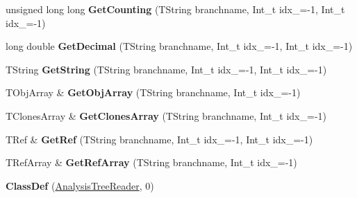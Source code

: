 \begin{DoxyCompactItemize}
\item 
\hypertarget{class_h_a_l_1_1_analysis_tree_reader_ad15baf30f4bed367d3ae74d9f30f9ac2}{unsigned long long {\bfseries Get\-Counting} (T\-String branchname, Int\-\_\-t idx\-\_=-\/1, Int\-\_\-t idx\-\_=-\/1)}\label{class_h_a_l_1_1_analysis_tree_reader_ad15baf30f4bed367d3ae74d9f30f9ac2}

\item 
\hypertarget{class_h_a_l_1_1_analysis_tree_reader_a487d617c759a5964df2af184b40cbfc2}{long double {\bfseries Get\-Decimal} (T\-String branchname, Int\-\_\-t idx\-\_=-\/1, Int\-\_\-t idx\-\_=-\/1)}\label{class_h_a_l_1_1_analysis_tree_reader_a487d617c759a5964df2af184b40cbfc2}

\item 
\hypertarget{class_h_a_l_1_1_analysis_tree_reader_a0039c2448c4bd7e75bd56383a82498e2}{T\-String {\bfseries Get\-String} (T\-String branchname, Int\-\_\-t idx\-\_=-\/1, Int\-\_\-t idx\-\_=-\/1)}\label{class_h_a_l_1_1_analysis_tree_reader_a0039c2448c4bd7e75bd56383a82498e2}

\item 
\hypertarget{class_h_a_l_1_1_analysis_tree_reader_a1c57d60d503bc7651e356326a72ad965}{T\-Obj\-Array \& {\bfseries Get\-Obj\-Array} (T\-String branchname, Int\-\_\-t idx\-\_=-\/1)}\label{class_h_a_l_1_1_analysis_tree_reader_a1c57d60d503bc7651e356326a72ad965}

\item 
\hypertarget{class_h_a_l_1_1_analysis_tree_reader_a487443628db3c4645715d06a767ac87c}{T\-Clones\-Array \& {\bfseries Get\-Clones\-Array} (T\-String branchname, Int\-\_\-t idx\-\_=-\/1)}\label{class_h_a_l_1_1_analysis_tree_reader_a487443628db3c4645715d06a767ac87c}

\item 
\hypertarget{class_h_a_l_1_1_analysis_tree_reader_a3acd24961efdefdcea7113641d13fee2}{T\-Ref \& {\bfseries Get\-Ref} (T\-String branchname, Int\-\_\-t idx\-\_=-\/1, Int\-\_\-t idx\-\_=-\/1)}\label{class_h_a_l_1_1_analysis_tree_reader_a3acd24961efdefdcea7113641d13fee2}

\item 
\hypertarget{class_h_a_l_1_1_analysis_tree_reader_ac066e0890402de4f4e518300608022a1}{T\-Ref\-Array \& {\bfseries Get\-Ref\-Array} (T\-String branchname, Int\-\_\-t idx\-\_=-\/1)}\label{class_h_a_l_1_1_analysis_tree_reader_ac066e0890402de4f4e518300608022a1}

\item 
\hypertarget{class_h_a_l_1_1_analysis_tree_reader_ad8be72de7b7f4ae5ced82c636ac91dd1}{{\bfseries Class\-Def} (\hyperlink{class_h_a_l_1_1_analysis_tree_reader}{Analysis\-Tree\-Reader}, 0)}\label{class_h_a_l_1_1_analysis_tree_reader_ad8be72de7b7f4ae5ced82c636ac91dd1}

\end{DoxyCompactItemize}
